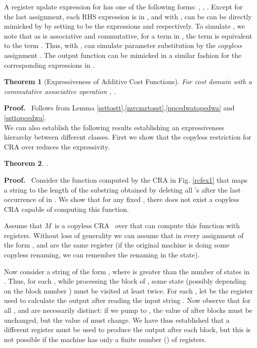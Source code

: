 \documentclass[11pt]{article}
\newtheorem{theorem}{Theorem}
\def\Proof{{\bf Proof.}}
\def\qed{{\bf }}
\def\qed{{\bf }}
\newcommand{\EDWA}{{CRA}\xspace}
\newcommand{\edwa}{\ensuremath{M}}
\begin{document}
A register update expression  for  has one of the
following forms: , , .
Except for the last assignment, each RHS expression is in
, and with , can be can be
directly mimicked by  by setting  to be the
expressions   and  respectively.  To simulate
, we note that as  is associative and
commutative, for a term in , the term  is
equivalent to the term . Thus, with ,  can simulate parameter substitution by the {\em copyless}
assignment .  The output function  can be
mimicked in a similar fashion for the corresponding expressions in
.
\qed



\begin{theorem}[Expressiveness of Additive Cost Functions]\label{regplus}
For cost domain  with a commutative associative operation ,
.
\end{theorem}
\Proof~ Follows from Lemma
\ref{ssttostt},\ref{mvcmrtosst},\ref{ppcedwatopedwa} and
\ref{ssttopcedwa}.
\qed \\

We can also establish the following results establishing an
expressiveness hierarchy between different classes.  First we show
that the copyless restriction for \EDWA over 
reduces the expressivity.

\begin{theorem}\label{thm:plus-c-copying-essential}
.
\end{theorem}

\Proof~ Consider the function  computed by the \EDWA  in
Fig.  \ref{rcfex1} that maps a string  to the length of the
substring obtained by deleting all 's after the last occurrence of
 in . We show that for any fixed , there does not exist a
copyless \EDWA capable of computing this function.

Assume that \edwa~is a copyless \EDWA~ over  that
can compute this function with  registers.  Without loss of
generality we can assume that in every assignment of the form ,  and  are the same register (if the original machine is
doing some copyless renaming, we can remember the renaming in the
state).

Now consider a string of the form , where
 is greater than the number of states in . Thus, for each
, while processing the  block of , some
state  (possibly depending on the block number ) must
be visited at least twice. For each , let  be the register
used to calculate the output after reading the input string .
Now observe that for all ,  and  are necessarily
distinct: if we pump  to ,
the value of  after  blocks must be unchanged, but the
value of  must change. We have thus established that a different
register must be used to produce the output after each block, but
this is not possible if the machine has only a finite number ()
of registers.
\qed
\end{document}
